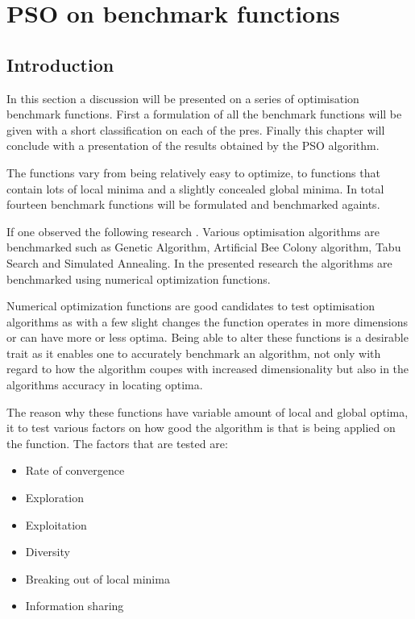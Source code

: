 \chapter{PSO on benchmark functions}
\label{chpt:benchmark}
\section{Introduction}
In this section a discussion will be presented on a series of optimisation benchmark functions. First a formulation of all the benchmark functions will be given with a short classification on each of the pres. Finally this chapter will conclude with a presentation of the results obtained by the PSO algorithm.

The functions vary from being relatively easy to optimize, to functions that contain lots of local minima and a slightly concealed global minima. In total fourteen benchmark functions will be formulated and benchmarked againts.

If one observed the following research \cite{devparallelgasa,CompuIntelligenceIntro,FundamentalSwarm}. Various optimisation algorithms are benchmarked such as Genetic Algorithm, Artificial Bee Colony algorithm, Tabu Search and Simulated Annealing. In the presented research the algorithms are benchmarked using numerical optimization functions.

Numerical optimization functions are good candidates to test optimisation algorithms as with a few slight changes the function operates in more dimensions or can have more or less optima\cite{devparallelgasa,CompuIntelligenceIntro,FundamentalSwarm}. Being able to alter these functions is a desirable trait as it enables one to accurately benchmark an algorithm, not only with regard to how the algorithm coupes with increased dimensionality but also in the algorithms accuracy in locating optima\cite{devparallelgasa,CompuIntelligenceIntro,FundamentalSwarm}.

The reason why these functions have variable amount of local and global optima, it to test various factors on how good the algorithm is that is being applied on the function. The factors that are tested are\cite{CompuIntelligenceIntro,FundamentalSwarm}:
\begin{itemize}
\item Rate of convergence
\item Exploration
\item Exploitation
\item Diversity
\item Breaking out of local minima
\item Information sharing
\end{itemize}

